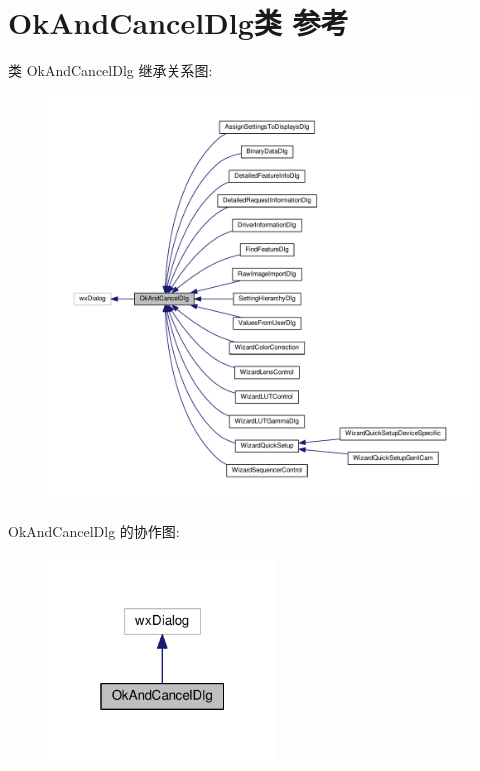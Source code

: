 \hypertarget{class_ok_and_cancel_dlg}{\section{Ok\+And\+Cancel\+Dlg类 参考}
\label{class_ok_and_cancel_dlg}
}


类 Ok\+And\+Cancel\+Dlg 继承关系图\+:
\nopagebreak
\begin{figure}[H]
\begin{center}
\leavevmode
\includegraphics[width=350pt]{class_ok_and_cancel_dlg__inherit__graph}
\end{center}
\end{figure}


Ok\+And\+Cancel\+Dlg 的协作图\+:
\nopagebreak
\begin{figure}[H]
\begin{center}
\leavevmode
\includegraphics[width=172pt]{class_ok_and_cancel_dlg__coll__graph}
\end{center}
\end{figure}
